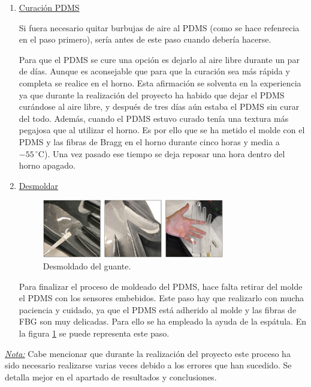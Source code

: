 \begin{itemize}
\begin{enumerate}
	
		\item \underline{Curación PDMS} 
		
		Si fuera necesario quitar burbujas de aire al PDMS (como se hace refenrecia en el paso primero), sería antes de este paso cuando debería hacerse.
		
		
		Para que el PDMS se cure una opción es dejarlo al aire libre durante un par de días. Aunque es aconsejable que para que la curación sea más rápida y completa se realice en el horno. Esta afirmación se solventa en la experiencia ya que durante la realización del proyecto ha habido que dejar el PDMS curándose al aire libre, y después de tres días aún estaba el PDMS sin curar del todo. Además, cuando el PDMS estuvo curado tenía una textura más pegajosa que al utilizar el horno. Es por ello que se ha metido el molde con el PDMS y las fibras de Bragg en el horno durante cinco horas y media a $-55\,^{\circ}\mathrm{C}$). Una vez pasado ese tiempo se deja reposar una hora dentro del horno apagado. 
		
		
		\item \underline{Desmoldar}
		
		\begin{figure}[H]
			\centering
			\includegraphics[width=0.75\textwidth]{./img/fabricacionGuante2}
			\caption{Desmoldado del guante.} \label{fig:fabricacionGuante2}
		\end{figure}
	
		Para finalizar el proceso de moldeado del PDMS, hace falta retirar del molde el PDMS con los sensores embebidos. Este paso hay que realizarlo con mucha paciencia y cuidado, ya que el PDMS está adherido al molde y las fibras de FBG son muy delicadas. Para ello se ha empleado la ayuda de la espátula. En la figura \ref{fig:fabricacionGuante2} se puede representa este paso.
		

	\end{enumerate}
	
\underline{\textit{Nota:}} Cabe mencionar que durante la realización del proyecto este proceso ha sido necesario realizarse varias veces debido a los errores que han sucedido. Se detalla mejor en el apartado de resultados y conclusiones.
		



\end{itemize}
